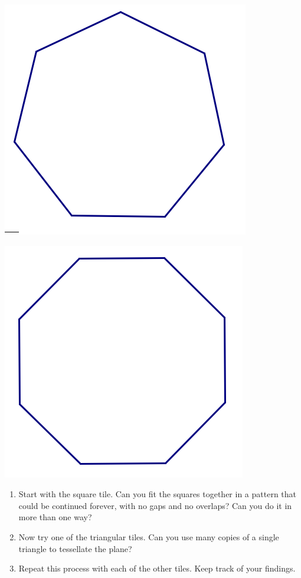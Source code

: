 \begin{center}
\includegraphics[scale=0.75]{heptagon}


\includegraphics[scale=0.7]{octagon}


\end{center}

\begin{enumerate}
\item
Start with the square tile.  Can you fit the squares together in a pattern that could be continued forever, with no gaps and no overlaps?  Can you do it in more than one way?\\

\item
Now try one of the triangular tiles.  Can you use many copies of a single triangle to tessellate the plane?\\

\item
Repeat this process with each of the other tiles.  Keep track of your findings.\\
\end{enumerate}


